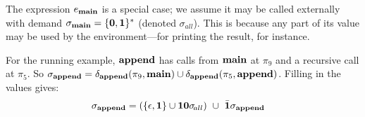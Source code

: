 The expression $e_{\mathbf{main}}$ is a special case; we assume it may be called externally
with demand $\sigma_{\mathbf{main}} = \{\mathbf{0},\mathbf{1}\}^\ast$ (denoted
$\sigma_{\!all}$).
This is because any  part  of its  value  may be  used  by  the environment---for
printing  the  result,  for  instance. 



% 
% 


For the running example, $\mathbf{append}$ has calls from $\mathbf{main}$ at $\pi_9$
and a recursive call at $\pi_5$.
So $\sigma_{\mathbf{append}} =
     \delta_{\mathbf{append}}({\pi_9},{\mathbf{main}})  \cup \delta_{\mathbf{append}}({\pi_5},{\mathbf{append}})$.
Filling in  the values gives:
\begin{align*}
\sigma_{\mathbf{append}}    &=
\left( \{\epsilon,  \mathbf{1}\} \cup  \mathbf{1}\mathbf{0}\sigma_{\!all}  \right) ~\cup~
\bar{\mathbf{1}}\sigma_{\mathit{\mathbf{append}}}
\end{align*}

